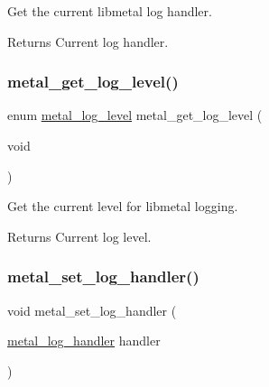Get the current libmetal log handler. 

\begin{DoxyReturn}{Returns}
Current log handler. 
\end{DoxyReturn}
\mbox{\label{group__logging_gaba9eb8e1922ace9eb3ac2a7fa9ff9700}} 
\subsubsection{\texorpdfstring{metal\+\_\+get\+\_\+log\+\_\+level()}{metal\_get\_log\_level()}}
{\footnotesize\ttfamily enum \hyperlink{group__logging_ga4ffa0f4a1339af510aca7f817ee36d82}{metal\+\_\+log\+\_\+level} metal\+\_\+get\+\_\+log\+\_\+level (\begin{DoxyParamCaption}\item[{void}]{ }\end{DoxyParamCaption})}



Get the current level for libmetal logging. 

\begin{DoxyReturn}{Returns}
Current log level. 
\end{DoxyReturn}
\mbox{\label{group__logging_ga68f2f88eeba019ecad0ad0f0cf42d724}} 
\subsubsection{\texorpdfstring{metal\+\_\+set\+\_\+log\+\_\+handler()}{metal\_set\_log\_handler()}}
{\footnotesize\ttfamily void metal\+\_\+set\+\_\+log\+\_\+handler (\begin{DoxyParamCaption}\item[{\hyperlink{group__logging_gaa79b2a8962227bb67c242b98afda292a}{metal\+\_\+log\+\_\+handler}}]{handler }\end{DoxyParamCaption})}



